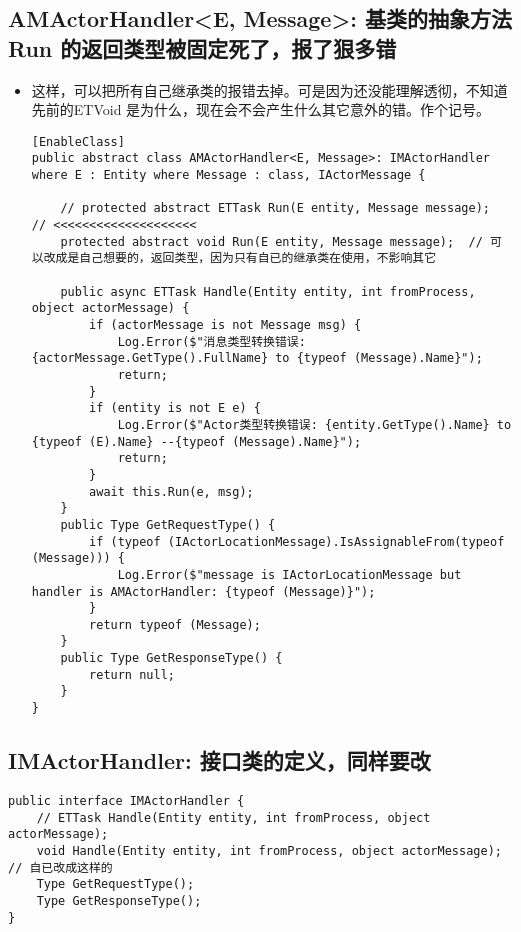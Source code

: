 \documentclass[9pt, b5paper]{article}
\begin{document}
\subsection{AMActorHandler<E, Message>: 基类的抽象方法 Run 的返回类型被固定死了，报了狠多错}
\label{sec-4-1}
\begin{itemize}
\item 这样，可以把所有自己继承类的报错去掉。可是因为还没能理解透彻，不知道先前的ETVoid 是为什么，现在会不会产生什么其它意外的错。作个记号。
\begin{verbatim}
[EnableClass]
public abstract class AMActorHandler<E, Message>: IMActorHandler where E : Entity where Message : class, IActorMessage {

    // protected abstract ETTask Run(E entity, Message message);  // <<<<<<<<<<<<<<<<<<<< 
    protected abstract void Run(E entity, Message message);  // 可以改成是自己想要的，返回类型，因为只有自已的继承类在使用，不影响其它 

    public async ETTask Handle(Entity entity, int fromProcess, object actorMessage) {
        if (actorMessage is not Message msg) {
            Log.Error($"消息类型转换错误: {actorMessage.GetType().FullName} to {typeof (Message).Name}");
            return;
        }
        if (entity is not E e) {
            Log.Error($"Actor类型转换错误: {entity.GetType().Name} to {typeof (E).Name} --{typeof (Message).Name}");
            return;
        }
        await this.Run(e, msg);
    }
    public Type GetRequestType() {
        if (typeof (IActorLocationMessage).IsAssignableFrom(typeof (Message))) {
            Log.Error($"message is IActorLocationMessage but handler is AMActorHandler: {typeof (Message)}");
        }
        return typeof (Message);
    }
    public Type GetResponseType() {
        return null;
    }
}
\end{verbatim}
\end{itemize}
\subsection{IMActorHandler: 接口类的定义，同样要改}
\label{sec-4-2}
\begin{verbatim}
public interface IMActorHandler {
    // ETTask Handle(Entity entity, int fromProcess, object actorMessage);
    void Handle(Entity entity, int fromProcess, object actorMessage); // 自已改成这样的
    Type GetRequestType();
    Type GetResponseType();
}
\end{verbatim}
\end{document}
